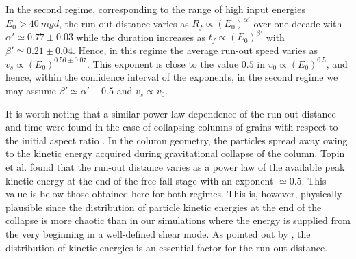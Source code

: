 In the second regime, corresponding to the range of high input energies  $E_0 > 
40 \ mgd$, the run-out distance varies as $R_f \propto (E_0)^{\alpha'}$ over one 
decade with $\alpha' \simeq 0.77\pm 0.03$ while the duration increases as $t_f 
\propto (E_0)^{\beta'}$ with $\beta' \simeq 0.21 \pm 0.04$. Hence, in this 
regime the average run-out speed varies as $v_s \propto (E_0)^{0.56 \pm 0.07}$. 
This exponent is close to the value $0.5$ in $v_0 \propto (E_0)^{0.5}$, and 
hence, within the confidence interval of the exponents, in the second regime we 
may assume $\beta' \simeq \alpha' - 0.5$ and $v_s \propto v_0$. 

It is worth noting that a similar power-law dependence of the 
run-out distance and time were found in the case of 
collapsing columns of grains with respect to the initial aspect ratio 
\cite{Topin2012}.  
In the column geometry, the particles spread away owing to the 
kinetic energy acquired during gravitational collapse of the column. 
Topin et al. found that the run-out distance varies as a power law 
of the available peak kinetic energy at the end of the free-fall stage with an 
exponent $\simeq 0.5$. This value is below those obtained here 
for both regimes. This is, however, physically plausible since the   
distribution of particle kinetic energies at the end of the collapse 
is more chaotic than in our simulations where the energy is supplied 
from the very beginning in a well-defined shear mode. As pointed out 
by \cite{Staron2005}, the distribution of kinetic energies is an essential 
factor for the run-out distance.




